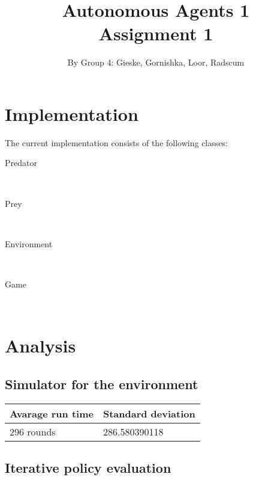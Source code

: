 \documentclass{article}
\begin{document}
\title{Autonomous Agents 1 \\ Assignment 1}

\author{By Group 4: Gieske, Gornishka, Loor, Radscum}
\maketitle

\section*{Implementation}

\noindent The current implementation consists of the following classes:
\begin{description}
	\item[Predator] \hfill \\ 
	
	\item[Prey] \hfill \\ 
	
	\item[Environment] \hfill \\ 
	
	\item[Game] \hfill \\ 
	
\end{description}


\section*{Analysis}


\subsection*{Simulator for the environment}


\begin{center}
	\begin{tabular}{  l ||  l }
		Avarage run time & Standard deviation \\ 
		\hline
		296 rounds &  286.580390118 %
	\end{tabular}
\end{center}

\subsection*{Iterative policy evaluation}
\end{document}
